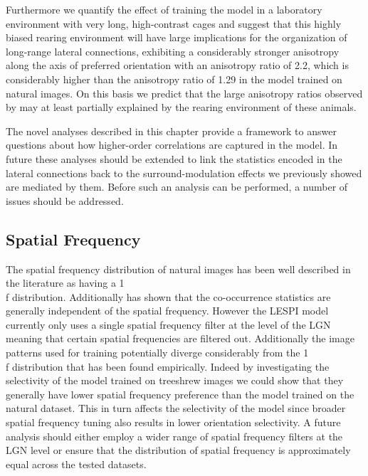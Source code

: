 Furthermore we quantify the effect of training the model in a
laboratory environment with very long, high-contrast cages and suggest
that this highly biased rearing environment will have large
implications for the organization of long-range lateral connections,
exhibiting a considerably stronger anisotropy along the axis of
preferred orientation with an anisotropy ratio of 2.2, which is
considerably higher than the anisotropy ratio of 1.29 in the model
trained on natural images. On this basis we predict that the large
anisotropy ratios observed by \citep{Bosking1997} may at least
partially explained by the rearing environment of these animals.

The novel analyses described in this chapter provide a framework to
answer questions about how higher-order correlations are captured in
the model. In future these analyses should be extended to link the
statistics encoded in the lateral connections back to the
surround-modulation effects we previously showed are mediated by
them. Before such an analysis can be performed, a number of issues
should be addressed.

\subsection{Spatial Frequency}

The spatial frequency distribution of natural images has been well
described in the literature as having a 1\\f
distribution. Additionally \cite{Perrinet2015} has shown that the
co-occurrence statistics are generally independent of the spatial
frequency. However the LESPI model currently only uses a single
spatial frequency filter at the level of the LGN meaning that certain
spatial frequencies are filtered out. Additionally the image patterns
used for training potentially diverge considerably from the 1\\f
distribution that has been found empirically. Indeed by investigating
the selectivity of the model trained on treeshrew images we could show
that they generally have lower spatial frequency preference than the
model trained on the natural dataset. This in turn affects the
selectivity of the model since broader spatial frequency tuning also
results in lower orientation selectivity. A future analysis should
either employ a wider range of spatial frequency filters at the LGN
level or ensure that the distribution of spatial frequency is
approximately equal across the tested datasets.

